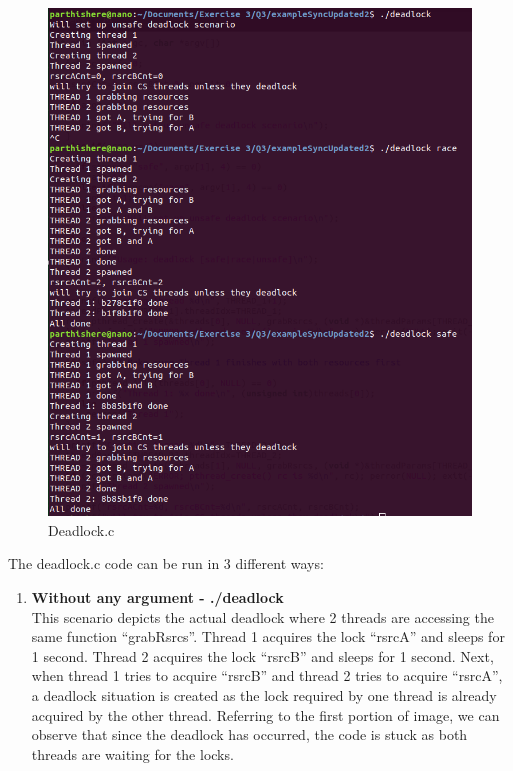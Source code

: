 \documentclass[a4paper,11pt]{article}%
\newenvironment{qanda}{\setlength{\parindent}{0pt}}{\bigskip}
\begin{document}
\begin{qanda}
\begin{enumerate}
\begin{enumerate}
					  \begin{figure}[H]
						\centering
						\includegraphics[scale=0.6]{figures/deadlock1.png}
						\caption{Deadlock.c}
					\end{figure}

				      The deadlock.c code can be run in 3 different ways:\\
				      \begin{enumerate}
					      \item \textbf{Without any argument - ./deadlock}\\
					            This scenario depicts the actual deadlock where 2 threads are accessing the same function “grabRsrcs”. Thread 1 acquires the lock “rsrcA” and sleeps for 1 second. Thread 2 acquires the lock “rsrcB” and sleeps for 1 second. Next, when thread 1 tries to acquire “rsrcB” and thread 2 tries to acquire “rsrcA”, a deadlock situation is created as the lock required by one thread is already acquired by the other thread. Referring to the first portion of image, we can observe that since the deadlock has occurred, the code is stuck as both threads are waiting for the locks.


\end{enumerate}
\end{enumerate}
\end{enumerate}
\end{qanda}
\end{document}
